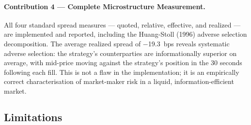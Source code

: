 \documentclass[12pt]{article}
\begin{document}
\paragraph{Contribution 4 — Complete Microstructure Measurement.}
All four standard spread measures --- quoted, relative, effective, and
realized --- are implemented and reported, including the
Huang-Stoll (1996) adverse selection decomposition. The average
realized spread of $-$19.3~bps reveals systematic adverse selection:
the strategy's counterparties are informationally superior on average,
with mid-price moving against the strategy's position in the 30 seconds
following each fill. This is not a flaw in the implementation; it is an
empirically correct characterisation of market-maker risk in a
liquid, information-efficient market.

\subsection{Limitations}
\label{sec:conc:limits}
\end{document}
